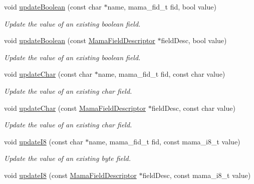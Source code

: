 \begin{DoxyCompactItemize}
void \hyperlink{classWombat_1_1MamaMsg_ae58341b32e813a3f3e3b5e299cf50c1b}{updateBoolean} (const char $\ast$name, mama\_\-fid\_\-t fid, bool value)
\begin{DoxyCompactList}\small\item\em Update the value of an existing boolean field. \item\end{DoxyCompactList}\item 
void \hyperlink{classWombat_1_1MamaMsg_a8f8ba0ad3f4ff75e2f72914251a45f18}{updateBoolean} (const \hyperlink{classWombat_1_1MamaFieldDescriptor}{MamaFieldDescriptor} $\ast$fieldDesc, bool value)
\begin{DoxyCompactList}\small\item\em Update the value of an existing boolean field. \item\end{DoxyCompactList}\item 
void \hyperlink{classWombat_1_1MamaMsg_a492e63d5fdaf884275d1180739fe6162}{updateChar} (const char $\ast$name, mama\_\-fid\_\-t fid, const char value)
\begin{DoxyCompactList}\small\item\em Update the value of an existing char field. \item\end{DoxyCompactList}\item 
void \hyperlink{classWombat_1_1MamaMsg_aa942ec291fe79302f98b172ab610e96b}{updateChar} (const \hyperlink{classWombat_1_1MamaFieldDescriptor}{MamaFieldDescriptor} $\ast$fieldDesc, const char value)
\begin{DoxyCompactList}\small\item\em Update the value of an existing char field. \item\end{DoxyCompactList}\item 
void \hyperlink{classWombat_1_1MamaMsg_a0b460f0e13b9a4e1eff7144f79b44d09}{updateI8} (const char $\ast$name, mama\_\-fid\_\-t fid, const mama\_\-i8\_\-t value)
\begin{DoxyCompactList}\small\item\em Update the value of an existing byte field. \item\end{DoxyCompactList}\item 
void \hyperlink{classWombat_1_1MamaMsg_ac23834437373d7784614f0493327b27c}{updateI8} (const \hyperlink{classWombat_1_1MamaFieldDescriptor}{MamaFieldDescriptor} $\ast$fieldDesc, const mama\_\-i8\_\-t value)

\end{DoxyCompactItemize}
